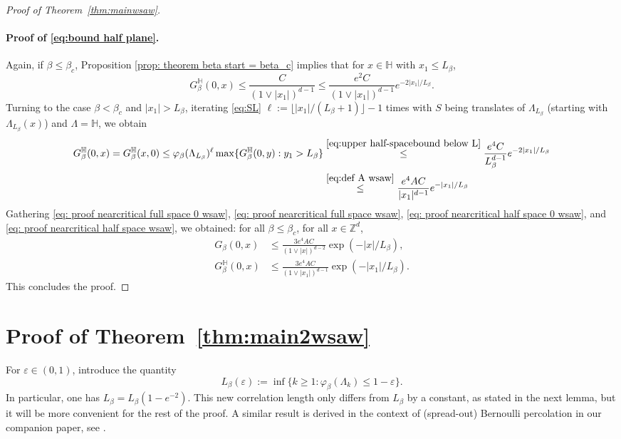 \documentclass[11pt,a4paper]{article}
\numberwithin{equation}{section}
\theoremstyle{plain}
\theoremstyle{definition}
\begin{document}
\begin{proof}[Proof of Theorem~\textup{\ref{thm:mainwsaw}}]
\paragraph{Proof of \eqref{eq:bound half plane}.} Again, if $\beta\leq \beta_c$, Proposition \ref{prop: theorem beta start = beta_c} implies that for $x\in \mathbb H$ with $x_1\leq L_\beta$,
\begin{equation}\label{eq: proof nearcritical half space 0 wsaw}
	G_\beta^{\mathbb H}(0,x)\leq \frac{C}{(1\vee |x_1|)^{d-1}}\leq \frac{e^2C}{(1\vee|x_1|)^{d-1}}e^{-2|x_1|/L_\beta}.
\end{equation}
Turning to the case $\beta<\beta_c$ and $|x_1|>L_\beta$, iterating \eqref{eq:SL} $\ell:=\lfloor |x_1|/(L_\beta+1)\rfloor-1$ times with $S$ being translates of $\Lambda_{L_\beta}$ (starting with $\Lambda_{L_\beta}(x)$) and $\Lambda=\mathbb H$, we obtain
\begin{align}
	G_\beta^{\mathbb H}(0,x)=G_\beta^{\mathbb H}(x,0)\leq \varphi_\beta(\Lambda_{L_\beta})^{\ell}\max\{G_\beta^{\mathbb H}(0,y): y_1> L_\beta\}&\stackrel{\eqref{eq:upper half-spacebound below L}}\leq \frac{e^4C}{L_\beta^{d-1}}e^{-2|x_1|/L_\beta}
	\\&\stackrel{\eqref{eq:def A wsaw}}\leq \frac{e^4AC}{|x_1|^{d-1}}e^{-|x_1|/L_\beta} \label{eq: proof nearcritical half space wsaw}
\end{align}
Gathering \eqref{eq: proof nearcritical full space 0 wsaw}, \eqref{eq: proof nearcritical full space wsaw}, \eqref{eq: proof nearcritical half space 0 wsaw}, and \eqref{eq: proof nearcritical half space wsaw}, we obtained: for all $\beta\leq \beta_c$, for all $x\in \mathbb Z^d$,
\begin{align}
G_\beta(0,x)&\le \frac{3e^4AC}{(1\vee|x|)^{d-2}}\exp(-|x|/L_\beta),\\
G_\beta^\mathbb H(0,x)&\le \frac{3e^4AC}{(1\vee|x_1|)^{d-1}}\exp(-|x_1|/L_\beta).
\end{align}
This concludes the proof.
\end{proof}

\section{Proof of Theorem~\ref{thm:main2wsaw}}

For $\varepsilon\in (0,1)$, introduce the quantity
\begin{equation}
L_\beta(\varepsilon):=\inf\{k\ge1:\varphi_\beta(\Lambda_k)\le 1-\varepsilon\}.
\end{equation}
In particular, one has $L_\beta=L_\beta(1-e^{-2})$.
This new correlation length only differs from $L_\beta$ by a constant, as stated in the next lemma, but it will be more convenient for the rest of the proof. A similar result is derived in the context of (spread-out) Bernoulli percolation in our companion paper, see \cite[Lemma~4.3]{DumPan24Perco}.
\end{document}
